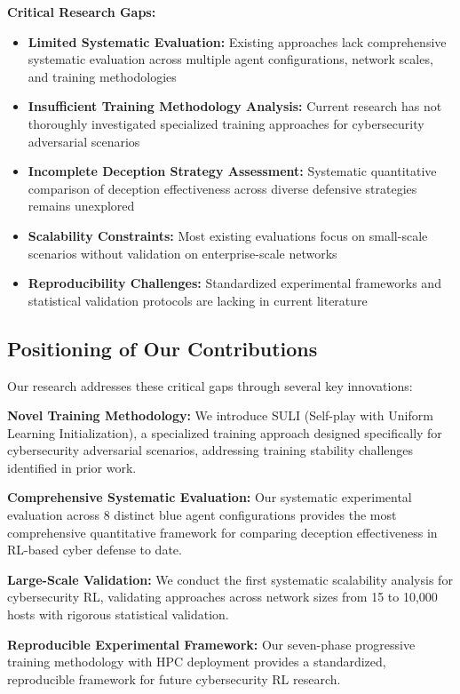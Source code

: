 \documentclass[12pt,twoside]{article}
\begin{document}
\textbf{Critical Research Gaps:}
\begin{itemize}
\item \textbf{Limited Systematic Evaluation:} Existing approaches lack comprehensive systematic evaluation across multiple agent configurations, network scales, and training methodologies
\item \textbf{Insufficient Training Methodology Analysis:} Current research has not thoroughly investigated specialized training approaches for cybersecurity adversarial scenarios
\item \textbf{Incomplete Deception Strategy Assessment:} Systematic quantitative comparison of deception effectiveness across diverse defensive strategies remains unexplored
\item \textbf{Scalability Constraints:} Most existing evaluations focus on small-scale scenarios without validation on enterprise-scale networks
\item \textbf{Reproducibility Challenges:} Standardized experimental frameworks and statistical validation protocols are lacking in current literature
\end{itemize}

\subsection{Positioning of Our Contributions}

Our research addresses these critical gaps through several key innovations:

\textbf{Novel Training Methodology:} We introduce SULI (Self-play with Uniform Learning Initialization), a specialized training approach designed specifically for cybersecurity adversarial scenarios, addressing training stability challenges identified in prior work.

\textbf{Comprehensive Systematic Evaluation:} Our systematic experimental evaluation across 8 distinct blue agent configurations provides the most comprehensive quantitative framework for comparing deception effectiveness in RL-based cyber defense to date.

\textbf{Large-Scale Validation:} We conduct the first systematic scalability analysis for cybersecurity RL, validating approaches across network sizes from 15 to 10,000 hosts with rigorous statistical validation.

\textbf{Reproducible Experimental Framework:} Our seven-phase progressive training methodology with HPC deployment provides a standardized, reproducible framework for future cybersecurity RL research.
\end{document}
